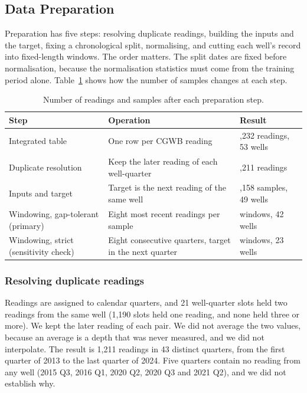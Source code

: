 \documentclass[conference]{IEEEtran}
\begin{document}
\subsection{Data Preparation}

Preparation has five steps: resolving duplicate readings, building the inputs and the target, fixing a chronological split, normalising, and cutting each well's record into fixed-length windows. The order matters. The split dates are fixed before normalisation, because the normalisation statistics must come from the training period alone. Table~\ref{tab:6} shows how the number of samples changes at each step.

\begin{table}[!t]
\centering\footnotesize
\caption{Number of readings and samples after each preparation step.}\label{tab:6}
\begin{tabular}{>{\raggedright\arraybackslash}p{}>{\raggedright\arraybackslash}p{}>{\raggedright\arraybackslash}p{}}
\toprule
\textbf{Step} & \textbf{Operation} & \textbf{Result} \\
\midrule
Integrated table & One row per CGWB reading & 1,232 readings, 53 wells \\
Duplicate resolution & Keep the later reading of each well-quarter & 1,211 readings \\
Inputs and target & Target is the next reading of the same well & 1,158 samples, 49 wells \\
Windowing, gap-tolerant (primary) & Eight most recent readings per sample & 840 windows, 42 wells \\
Windowing, strict (sensitivity check) & Eight consecutive quarters, target in the next quarter & 157 windows, 23 wells \\
\bottomrule
\end{tabular}
\end{table}

\subsubsection{Resolving duplicate readings}

Readings are assigned to calendar quarters, and 21 well-quarter slots held two readings from the same well (1,190 slots held one reading, and none held three or more). We kept the later reading of each pair. We did not average the two values, because an average is a depth that was never measured, and we did not interpolate. The result is 1,211 readings in 43 distinct quarters, from the first quarter of 2013 to the last quarter of 2024. Five quarters contain no reading from any well (2015 Q3, 2016 Q1, 2020 Q2, 2020 Q3 and 2021 Q2), and we did not establish why.
\end{document}
